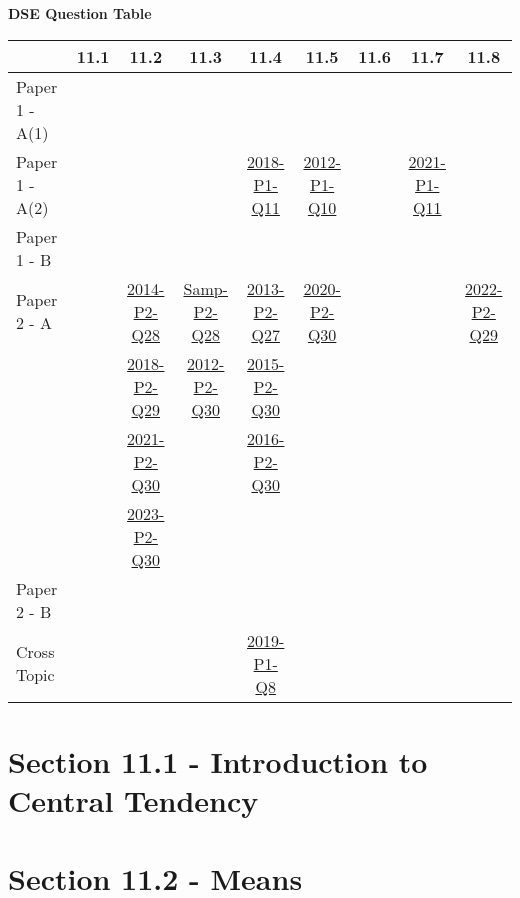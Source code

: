 \documentclass[12pt, a4paper]{article}
\begin{document}
\begin{absolutelynopagebreak}
\begin{center}
\textbf{DSE Question Table}
\end{center}
\begin{center}
\begin{tabular}{|l|c|c|c|c|c|c|c|c|}
\hline
        & 11.1 & 11.2 & 11.3 & 11.4 & 11.5 & 11.6 & 11.7 & 11.8 \\\hline
\hline
Paper 1 - A(1)&  &  &  &  &  &  &  &  \\
\hline
Paper 1 - A(2)&  &  &  & \hyperref[DSE2018-CoreP1-Q11]{2018-P1-Q11} & \hyperref[DSE2012-CoreP1-Q10]{2012-P1-Q10} &  & \hyperref[DSE2021-CoreP1-Q11]{2021-P1-Q11} &  \\
\hline
Paper 1 - B&  &  &  &  &  &  &  &  \\
\hline
\hline
Paper 2 - A&  & \hyperref[DSE2014-CoreP2-Q28]{2014-P2-Q28} & \hyperref[DSE2012S-CoreP2-Q28]{Samp-P2-Q28} & \hyperref[DSE2013-CoreP2-Q27]{2013-P2-Q27} & \hyperref[DSE2020-CoreP2-Q30]{2020-P2-Q30} &  &  & \hyperref[DSE2022-CoreP2-Q29]{2022-P2-Q29} \\
&  & \hyperref[DSE2018-CoreP2-Q29]{2018-P2-Q29} & \hyperref[DSE2012-CoreP2-Q30]{2012-P2-Q30} & \hyperref[DSE2015-CoreP2-Q30]{2015-P2-Q30} &  &  &  &  \\
&  & \hyperref[DSE2021-CoreP2-Q30]{2021-P2-Q30} &  & \hyperref[DSE2016-CoreP2-Q30]{2016-P2-Q30} &  &  &  &  \\
&  & \hyperref[DSE2023-CoreP2-Q30]{2023-P2-Q30} &  &  &  &  &  &  \\
\hline
Paper 2 - B&  &  &  &  &  &  &  &  \\
\hline
\hline
Cross Topic&  &  &  & \hyperref[DSE2019-CoreP1-Q08]{2019-P1-Q8} &  &  &  &  \\
\hline
\end{tabular}
\end{center}
\end{absolutelynopagebreak}




\section*{Section 11.1 - Introduction to Central Tendency }\label{section:3-11-1}





\section*{Section 11.2 - Means}\label{section:3-11-2}
\end{document}
